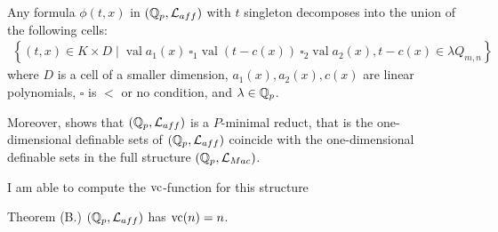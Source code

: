\documentclass{amsart}
\renewcommand{\LL}{\mathcal L}
\newcommand{\LLA}{\mathcal L_{aff}}
\newcommand{\LLM}{\mathcal L_{Mac}}
\newcommand{\curly}[1]{\left\{#1\right\}}
\DeclareMathOperator{\vval}{val}
\begin{document}
\begin{Theorem}
  Any formula $\phi(t, x)$ in $(\Q_p, \LL_{aff})$ with $t$ singleton decomposes into the union of the following cells:
  \begin{align*}
    \curly{(t, x) \in K \times D \mid \vval a_1(x) \ \square_1 \vval (t - c(x)) \ \square_2 \vval a_2(x), t - c(x) \in \lambda Q_{m,n} }
  \end{align*}
  where $D$ is a cell of a smaller dimension,
  $a_1(x), a_2(x), c(x)$ are linear polynomials,
  $\square$ is $<$ or no condition, and
  $\lambda  \in\mathbb{Q}_p$.
\end{Theorem}  

Moreover, \cite{reduct} shows that $(\Q_p, \LL_{aff})$ is a $P$-minimal reduct,
that is the one-dimensional definable sets of $(\Q_p, \LL_{aff})$ coincide with the one-dimensional definable sets in the full structure $(\Q_p, \LLM)$.

I am able to compute the $\operatorname{vc}$-function for this structure
\begin{Theorem} {Theorem (B.)}
  $(\Q_p, \LL_{aff})$ has $\operatorname{vc}(n) = n$.
\end{Theorem}









\end{document}
